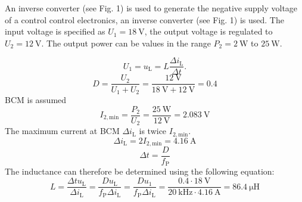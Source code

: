 

An inverse converter (see Fig. 1) is used to generate the negative supply voltage of a control control electronics, an inverse converter (see Fig. 1) is used. The input voltage is specified as $U_\mathrm{1}=\SI{18}{\volt}$, the output voltage is regulated to $U_\mathrm{2}=\SI{12}{\volt}$. The output power can be values in the range $P_\mathrm{2}=\SI{2}{\watt}$ to $\SI{25}{\watt}$.




\begin{solutionblock}
    \begin{equation}
        U_{\mathrm{1}} = u_{\mathrm{L}} = L \frac{\Delta i_{\mathrm{L}} }{\Delta t}. 
    \end{equation}
\begin{equation}
    D = \frac{U_\mathrm{2}}{U_\mathrm{1}+U_\mathrm{2}} = \frac{\SI{12}{\volt}}{\SI{18}{\volt}+\SI{12}{\volt}} = 0.4
\end{equation}
BCM is assumed
\begin{equation}
    I_\mathrm{2,min} = \frac{P_\mathrm{2}}{U_\mathrm{2}}=\frac{\SI{25}{\watt}}{\SI{12}{\volt}}=\SI{2.083}{\volt}
\end{equation}
The maximum current at BCM $\Delta i_{\mathrm{L}}$ is twice  $I_\mathrm{2,min}$.
\begin{equation}
    \Delta i_{\mathrm{L}} = 2  I_\mathrm{2,min} = \SI{4.16}{\ampere}
\end{equation}
\begin{equation}
    \Delta t = \frac{D}{f_\mathrm{P}}
\end{equation}
The inductance can therefore be determined using the following equation:
\begin{equation}
    L = \frac{\Delta t  u_{\mathrm{L}}}{\Delta i_{\mathrm{L}}}= \frac{D u_{\mathrm{L}}}{f_\mathrm{P}\Delta i_{\mathrm{L}}}= \frac{D u_{\mathrm{1}}}{f_\mathrm{P}\Delta i_{\mathrm{L}}} = \frac{0.4 \cdot \SI{18}{\volt}}{\SI{20}{\kilo\hertz}\cdot \SI{4.16}{\ampere }} = \SI{86.4}{\micro\henry}
\end{equation}

\end{solutionblock}

